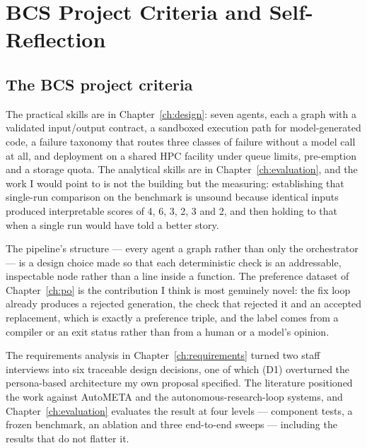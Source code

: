 \chapter{BCS Project Criteria and Self-Reflection}
\label{ch:bcs}


\section{The BCS project criteria}

\begin{description}[style=unboxed,leftmargin=0pt,itemsep=0.4em]

\item[An ability to apply practical and analytical skills.] The practical skills
are in Chapter~\ref{ch:design}: seven agents, each a graph with a validated
input/output contract, a sandboxed execution path for model-generated code, a
failure taxonomy that routes three classes of failure without a model call at all,
and deployment on a shared HPC facility under queue limits, pre-emption and a
storage quota. The analytical skills are in Chapter~\ref{ch:evaluation}, and the
work I would point to is not the building but the measuring: establishing that
single-run comparison on the benchmark is unsound because identical inputs produced
interpretable scores of 4, 6, 3, 2, 3 and 2, and then holding to that when a single
run would have told a better story.

\item[Innovation and creativity.] The pipeline's structure --- every agent a graph
rather than only the orchestrator --- is a design choice made so that each
deterministic check is an addressable, inspectable node rather than a line inside a
function. The preference dataset of Chapter~\ref{ch:po} is the contribution I
think is most genuinely novel: the fix loop already produces a rejected generation,
the check that rejected it and an accepted replacement, which is exactly a
preference triple, and the label comes from a compiler or an exit status rather
than from a human or a model's opinion.

\item[Synthesis of information, ideas and practices, with evaluation.] The
requirements analysis in Chapter~\ref{ch:requirements} turned two staff interviews
into six traceable design decisions, one of which (D1) overturned the persona-based
architecture my own proposal specified. The literature positioned the work against
AutoMETA and the autonomous-research-loop systems, and Chapter~\ref{ch:evaluation}
evaluates the result at four levels --- component tests, a frozen benchmark, an
ablation and three end-to-end sweeps --- including the results that do not flatter
it.


\end{description}
